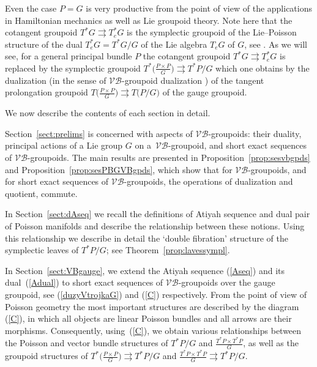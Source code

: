 \documentclass[10pt,a4paper]{amsart}
\newcommand{\tto}{\rightrightarrows}
\numberwithin{equation}{section}
\begin{document}
Even the case $P=G$ is very productive from the point of view of the applications in Hamiltonian mechanics as well as Lie groupoid theory. Note here that the cotangent groupoid $T^*G\tto T_e^*G$ is the symplectic groupoid of the Lie--Poisson structure of the dual $T^*_eG=T^*G/G$ of the Lie algebra $T_eG$ of $G$, see \cite{Wei}. As we will see, for a general principal bundle $P$ the cotangent groupoid $T^*G\tto T^*_e{G}$ is replaced by the symplectic groupoid $T^*\big(\frac{P\times P}{G}\big)\tto T^*P/G$ which one obtains by the dualization (in the sense of $\mathcal{V}\!\mathcal{B}$-groupoid dualization \cite{Mackenzie:GT, Pradines:1988}) of the tangent prolongation groupoid $T\big(\frac{P\times P}{G})\tto T(P/G\big)$ of the gauge groupoid.

We now describe the contents of each section in detail.

Section~\ref{sect:prelims} is concerned with aspects of $\mathcal{V}\!\mathcal{B}$-groupoids: their duality, principal actions of a Lie group $G$ on a~$\mathcal{V}\!\mathcal{B}$-groupoid, and short exact sequences of $\mathcal{V}\!\mathcal{B}$-groupoids. The main results are presented in Proposition~\ref{prop:sesvbgpds} and Proposition~\ref{prop:sesPBGVBgpds}, which show that for $\mathcal{V}\!\mathcal{B}$-groupoids, and for short exact sequences of $\mathcal{V}\!\mathcal{B}$-groupoids, the operations of dualization and quotient, commute.

In Section~\ref{sect:dAseq} we recall the def\/initions of Atiyah sequence and dual pair of Poisson manifolds and describe the relationship between these notions. Using this relationship we describe in detail the `double f\/ibration' structure of the symplectic leaves of $T^*P/G$; see Theorem~\ref{prop:lavessympl}.

In Section~\ref{sect:VBgauge}, we extend the Atiyah sequence (\ref{Aseq}) and its dual~(\ref{Adual}) to short exact sequences of $\mathcal{V}\!\mathcal{B}$-groupoids over the gauge groupoid, see (\ref{duzyVtrojkaG}) and (\ref{C}) respectively. From the point of view of Poisson geometry the most important structures are described by the diagram (\ref{C}), in which all objects are linear Poisson bundles and all arrows are their morphisms. Consequently, using~(\ref{C}), we obtain various relationships between the Poisson and vector bundle structures of $T^*P/G$ and $\frac{T^*P\times T^*P}{G}$, as well as the groupoid structures of $T^*\big(\frac{P\times P}{G}\big)\tto T^*P/G$ and $\frac{T^*P\times T^*P}{G}\tto T^*P/G$.
\end{document}

